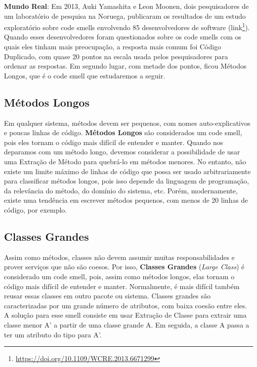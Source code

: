 \documentclass[
  11pt,
  twoside]{book}
\DeclareRobustCommand{\href}[2]{#2\footnote{\url{#1}}}
\newenvironment{esmbox}{\centering \vspace{1.5ex} \begin{tcolorbox}[breakable, colback=backcolor, width=4.9in]}{\end{tcolorbox} \vspace{1.5ex}}
\begin{document}
\begin{esmbox}

\textbf{Mundo Real}: Em 2013, Auki Yamashita e Leon Moonen, dois
pesquisadores de um laboratório de pesquisa na Noruega, publicaram os
resultados de um estudo exploratório sobre code smells envolvendo 85
desenvolvedores de software
(\href{https://doi.org/10.1109/WCRE.2013.6671299}{link}). Quando esses
desenvolvedores foram questionados sobre os code smells com os quais
eles tinham mais preocupação, a resposta mais comum foi Código
Duplicado, com quase 20 pontos na escala usada pelos pesquisadores para
ordenar as respostas. Em segundo lugar, com metade dos pontos, ficou
Métodos Longos, que é o code smell que estudaremos a seguir.

\end{esmbox}

\hypertarget{muxe9todos-longos}{%
\subsection{Métodos Longos}\label{muxe9todos-longos}}


Em qualquer sistema, métodos devem ser pequenos, com nomes
auto-explicativos e poucas linhas de código. \textbf{Métodos Longos} são
considerados um code smell, pois eles tornam o código mais difícil de
entender e manter. Quando nos deparamos com um método longo, devemos
considerar a possibilidade de usar uma Extração de Método para quebrá-lo
em métodos menores. No entanto, não existe um limite máximo de linhas de
código que possa ser usado arbitrariamente para classificar métodos
longos, pois isso depende da linguagem de programação, da relevância do
método, do domínio do sistema, etc. Porém, modernamente, existe uma
tendência em escrever métodos pequenos, com menos de 20 linhas de
código, por exemplo.

\hypertarget{classes-grandes}{%
\subsection{Classes Grandes}\label{classes-grandes}}


Assim como métodos, classes não devem assumir muitas responsabilidades e
prover serviços que não são coesos. Por isso, \textbf{Classes Grandes}
(\emph{Large Class}) é considerado um code smell, pois, assim como
métodos longos, elas tornam o código mais difícil de entender e manter.
Normalmente, é mais difícil também reusar essas classes em outro pacote
ou sistema. Classes grandes são caracterizadas por um grande número de
atributos, com baixa coesão entre eles. A solução para esse smell
consiste em usar Extração de Classe para extrair uma classe menor A' a
partir de uma classe grande A. Em seguida, a classe A passa a ter um
atributo do tipo para A'.
\end{document}
